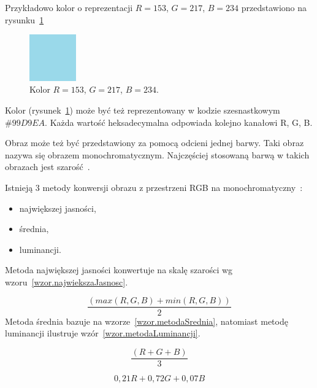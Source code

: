 \documentclass[a4paper,twoside,12pt]{book}
\begin{document}
    Przykładowo kolor o reprezentacji $R=153$, $G=217$, $B=234$ przedstawiono na rysunku~\ref{fig.mieszanieKolorowBlekitny}

    \begin{figure}
        \centering
        \includegraphics[width=2cm]{Obrazy/blekitny.jpg}
        \caption{Kolor $R=153$, $G=217$, $B=234$.}
        \label{fig.mieszanieKolorowBlekitny}
    \end{figure}

    Kolor (rysunek~\ref{fig.mieszanieKolorowBlekitny}) może być też reprezentowany w kodzie szesnastkowym $\#99D9EA$.
    Każda
    wartość heksadecymalna odpowiada kolejno kanałowi R, G, B.

    Obraz może też być przedstawiony za pomocą odcieni jednej barwy.
    Taki obraz nazywa się obrazem monochromatycznym.
    Najczęściej stosowaną barwą w takich obrazach jest szarość~\cite{przestrzenieKolorow}.

    Istnieją 3 metody konwersji obrazu z przestrzeni RGB na monochromatyczny~\cite{colorMixing}: %
    \begin{itemize}
        \item największej jasności,
        \item średnia,
        \item luminancji.
    \end{itemize}
    Metoda największej jasności konwertuje na skalę szarości wg wzoru~\ref{wzor.najwiekszaJasnosc}.

    \begin{equation}
        \frac{(max(R, G, B) + min(R, G, B))}{2}
        \label{wzor.najwiekszaJasnosc}
    \end{equation}
    \normalsize
    Metoda średnia bazuje na wzorze~\ref{wzor.metodaSrednia}, natomiast metodę luminancji ilustruje wzór~\ref{wzor.metodaLuminancji}.

    \begin{equation}
        \frac{(R + G + B)}{3}
        \label{wzor.metodaSrednia}
    \end{equation}
    \normalsize

    \begin{equation}
        0,21 R + 0,72 G + 0,07 B
        \label{wzor.metodaLuminancji}
    \end{equation}
    \normalsize
\end{document}
